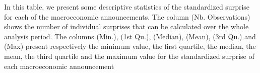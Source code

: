 \begin{landscape}
\begin{table}[]
\begin{center}
\begin{tabular}{@{}lccccccc@{}}
\end{tabular}
\end{center}
\begin{tablenotes}
        \singlespacing
        \footnotesize
In this table, we present some descriptive statistics of the standardized surprise for each of the macroeconomic announcements. The column (Nb. Observations) shows the number of individual surprises that can be calculated over the whole analysis period. The columns (Min.), (1st Qu.), (Median), (Mean), (3rd Qu.) and (Max) present respectively the minimum value, the first quartile, the median, the mean, the third quartile and the maximum value for the standardized surprise of each macroeconomic announcement 
\end{tablenotes}
\end{table}
\end{landscape}

